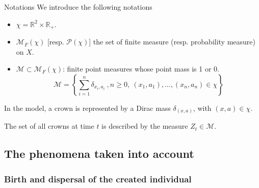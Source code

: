 \documentclass{myBeamer}
\newcommand{\R}{\mathbb R}%
\newcommand{\Mcal}{\mathcal{M}}%
\newcommand{\Pcal}{\mathcal P}%
\begin{document}

\begin{frame}{Notations}
We introduce the following notations 
\begin{itemize}
 \item $ \chi = \R^2 \times \R_+$. 
 \item $\Mcal_F ( \chi )$  [resp. $\Pcal(\chi)$] the set of finite measure (resp. probability measure) on $X$. 
\item   $\Mcal \subset \Mcal_F ( \chi)$: finite point measures whose point mass is 1 or 0.  
\begin{equation*}
\Mcal = \left\{  \sum_{i=1}^n  \delta_{x_i,a_i} ~ , n \geq 0 , ~ (x_1,a_1), \ldots, (x_n,a_n) \in      \chi  \right\}
\end{equation*}   
\end{itemize}

In the model, a crown is represented by a Dirac mass $\delta_{(x,a)}$, with $(x,a) \in \chi$.

\smallbreak
The set of all crowns at time $t$ is described by the measure $Z_t \in \Mcal$.
\end{frame}



\subsection*{The phenomena taken into account}
\subsubsection*{Birth and dispersal of the created individual}
\end{document}
